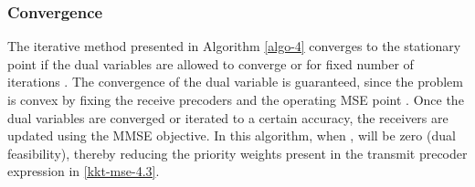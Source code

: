 \subsubsection*{Convergence}
The iterative method presented in Algorithm \ref{algo-4} converges to the stationary point if the dual variables  are allowed to converge or for fixed number of iterations . The convergence of the dual variable is guaranteed, since the problem is convex by fixing the receive precoders  and the operating \ac{MSE} point  \cite{boyd2011distributed}. Once the dual variables are converged or iterated to a certain accuracy, the receivers are updated using the \ac{MMSE} objective. In this algorithm, when ,  will be zero (dual feasibility), thereby reducing the priority weights  present in the transmit precoder expression in \eqref{kkt-mse-4.3}.
